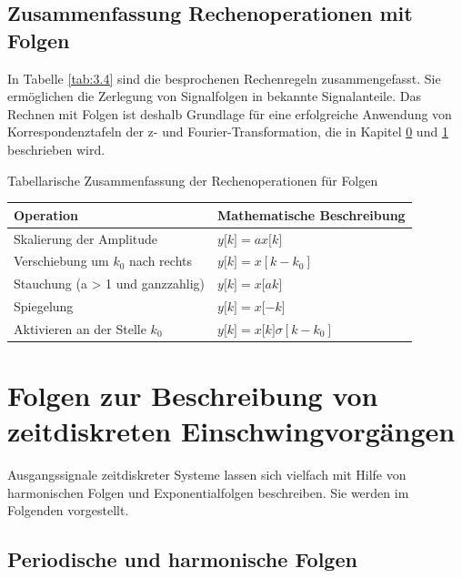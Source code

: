 \subsection{Zusammenfassung Rechenoperationen mit Folgen}\label{sec:zusammenfassung-rechenoperationen-mit-folgen}

In Tabelle \ref{tab:3.4} sind die besprochenen Rechenregeln zusammengefasst. Sie ermöglichen die Zerlegung von Signalfolgen in bekannte Signalanteile. Das Rechnen mit Folgen ist deshalb Grundlage für eine erfolgreiche Anwendung von Korrespondenztafeln der z- und Fourier-Transformation, die in Kapitel \hyperref[_Toc177369030]{0} und \hyperref[section]{1} beschrieben wird.

\begin{summary}{Tabellarische Zusammenfassung der Rechenoperationen für Folgen}
\label{tab:3.4}
\begin{center}
  \begin{tabular}{ll}
    \toprule
    Operation & Mathematische Beschreibung \\
    \midrule
    Skalierung der Amplitude & \(y\lbrack k\rbrack = a  x\lbrack k\rbrack\) \\
    Verschiebung um \(k_{0}\) nach rechts & \(y\lbrack k\rbrack = x\left\lbrack k - k_{0} \right\rbrack\) \\
    Stauchung (a \textgreater{} 1 und ganzzahlig) & \(y\lbrack k\rbrack = x\lbrack a  k\rbrack\) \\
    Spiegelung & \(y\lbrack k\rbrack = x\lbrack - k\rbrack\) \\
    Aktivieren an der Stelle \(k_{0}\) & \(y\lbrack k\rbrack = x\lbrack k\rbrack  \sigma\left\lbrack k - k_{0} \right\rbrack\) \\
    \bottomrule
  \end{tabular}
\end{center}
\end{summary}

\section{\texorpdfstring{Folgen zur Beschreibung von zeitdiskreten Einschwingvorgängen }{Folgen zur Beschreibung von zeitdiskreten Einschwingvorgängen }}\label{sec:3.4}

Ausgangssignale zeitdiskreter Systeme lassen sich vielfach mit Hilfe von harmonischen Folgen und Exponentialfolgen beschreiben. Sie werden im Folgenden vorgestellt.

\subsection{Periodische und harmonische Folgen}\label{sec:periodische-und-harmonische-folgen}

